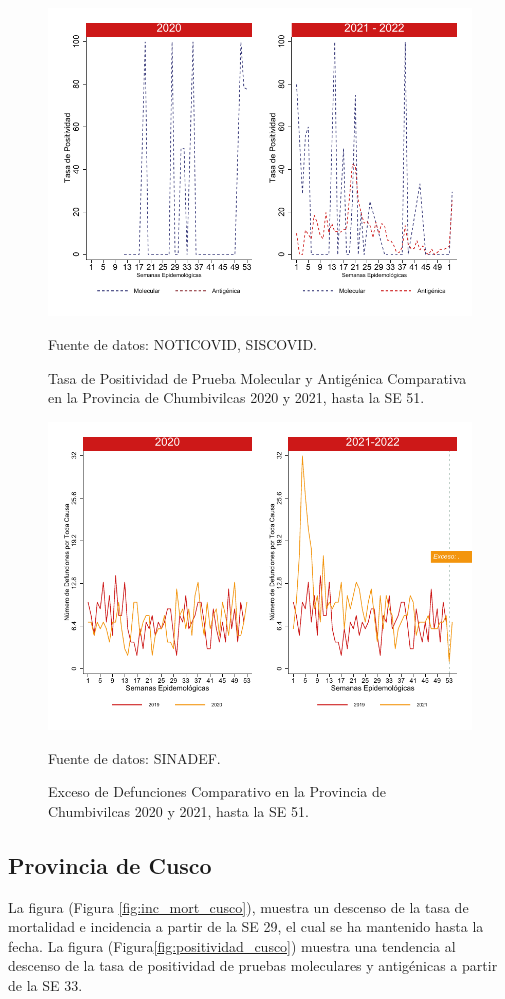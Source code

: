 \documentclass[12pt,a4paper,openany]{book}
\begin{document}
		\begin{figure}[h]
			\caption{Tasa de Positividad de Prueba Molecular y Antigénica Comparativa en la Provincia de Chumbivilcas 2020 y 2021, hasta la SE 51.}\label{fig:positividad_chumbivilcas}
			\begin{center}
				\includegraphics[width=0.7\linewidth]{../figuras/positividad_20_21_6}
			\end{center}
			{\footnotesize {Fuente de datos: NOTICOVID, SISCOVID.}}
		\end{figure}
		
		\begin{figure}[h]
			\caption{Exceso de Defunciones Comparativo en la Provincia de Chumbivilcas 2020 y 2021, hasta la SE 51.}\label{fig:exceso_chumbivilcas}
			\begin{center}
				\includegraphics[width=0.7\linewidth]{../figuras/exceso_6}
			\end{center}
			{\footnotesize {Fuente de datos: SINADEF.}}
		\end{figure}
		
		\clearpage
		
		\subsection*{Provincia de Cusco}
		\noindent La figura (Figura \ref{fig:inc_mort_cusco}),  muestra un descenso de la tasa de mortalidad e incidencia a partir de la SE 29, el cual se ha mantenido hasta la fecha. 
		\noindent La figura (Figura\ref{fig:positividad_cusco}) muestra una tendencia al descenso de la tasa de positividad de pruebas moleculares y antigénicas a partir de la SE 33.
	
\end{document}
